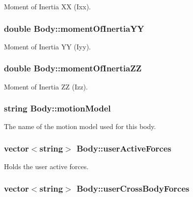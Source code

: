 Moment of Inertia X\-X (Ixx). \hypertarget{class_body_adc1f40d6f14c7fea48f261170b8f4746}{
\subsubsection[{moment\-Of\-Inertia\-Y\-Y}]{\setlength{\rightskip}{0pt plus 5cm}double Body\-::moment\-Of\-Inertia\-Y\-Y}}\label{class_body_adc1f40d6f14c7fea48f261170b8f4746}
Moment of Inertia Y\-Y (Iyy). \hypertarget{class_body_a6f7c025addc1fd46cf72c18713a9cacf}{
\subsubsection[{moment\-Of\-Inertia\-Z\-Z}]{\setlength{\rightskip}{0pt plus 5cm}double Body\-::moment\-Of\-Inertia\-Z\-Z}}\label{class_body_a6f7c025addc1fd46cf72c18713a9cacf}
Moment of Inertia Z\-Z (Izz). \hypertarget{class_body_a013a08fbeb1dd82131735dade5faa972}{
\subsubsection[{motion\-Model}]{\setlength{\rightskip}{0pt plus 5cm}string Body\-::motion\-Model}}\label{class_body_a013a08fbeb1dd82131735dade5faa972}
The name of the motion model used for this body. \hypertarget{class_body_a76e1e921e0cec08caed125073844c217}{
\subsubsection[{user\-Active\-Forces}]{\setlength{\rightskip}{0pt plus 5cm}vector$<$string$>$ Body\-::user\-Active\-Forces}}\label{class_body_a76e1e921e0cec08caed125073844c217}
Holds the user active forces. \hypertarget{class_body_a0ab89cfc3da49d74fa35ed90a0740e28}{
\subsubsection[{user\-Cross\-Body\-Forces}]{\setlength{\rightskip}{0pt plus 5cm}vector$<$string$>$ Body\-::user\-Cross\-Body\-Forces}}\label{class_body_a0ab89cfc3da49d74fa35ed90a0740e28}
